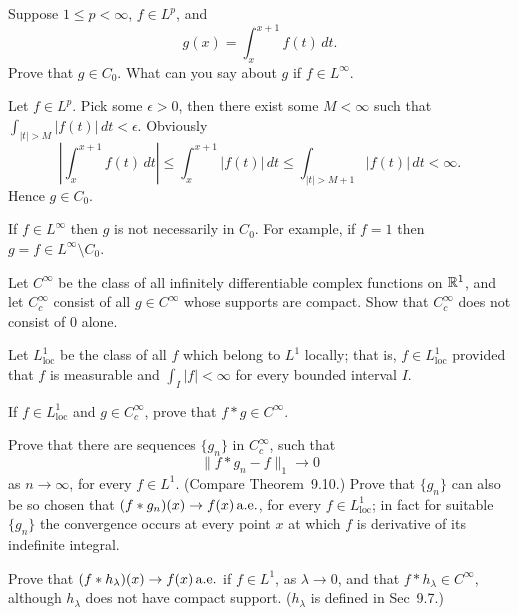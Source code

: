 \begin{enumerate}
\begin{excopy}
Suppose \(1\leq p < \infty\), \(f\in L^p\), and
\begin{equation*}
g(x) = \int_x^{x+1} f(t)\,dt.
\end{equation*}
Prove that \(g\in C_0\). What can you say about $g$ if \(f\in L^\infty\).
\end{excopy}

Let \(f\in L^p\). Pick some \(\epsilon>0\), then there exist some \(M<\infty\)
such that \(\int_{|t|>M} |f(t)|\,dt < \epsilon\).
Obviously 
\begin{equation*}
\left|\int_x^{x+1}f(t)\,dt\right|
\leq \int_x^{x+1}|f(t)|\,dt
\leq \int_{|t|>M+1}|f(t)|\,dt < \infty.
\end{equation*}
Hence \(g\in C_0\).

If \(f\in L^\infty\) then $g$ is not necessarily in \(C_0\).
For example, if \(f=1\) then \(g=f\in L^\infty \setminus C_0\).


\begin{excopy}
Let \(C^\infty\) be the class of all infinitely differentiable complex functions
on \(\mathbb{R}^1\), and let \(C_c^\infty\) consist of all \(g\in C^\infty\) 
whose supports are compact.
Show that  \(C_c^\infty\) does not consist of $0$ alone.

Let \(L_{\textrm{loc}}^1\) be the class 
of all $f$ which belong to \(L^1\) locally;
that is, \(f\in L_{\textrm{loc}}^1\) provided that $f$ is measurable
and \(\int_I |f|<\infty\) for every bounded interval $I$.

If \(f\in L_{\textrm{loc}}^1\) and \(g\in C_c^\infty\), prove that 
\(f\ast g \in C^\infty\).

Prove that there are sequences \(\{g_n\}\) in \(C_c^\infty\), such that
\begin{equation*}
\|f\ast g_n - f\|_1 \to 0
\end{equation*}
as \(n\to \infty\), for every \(f\in L^1\).
(Compare Theorem~9.10.)
Prove that  \(\{g_n\}\) can also be so chosen that 
\((f\ast g_n)(x) \to f(x)\,\textrm{a.e.}\), for every \(f\in L_{\textrm{loc}}^1\);
in fact for suitable \(\{g_n\}\) the convergence occurs at every point
$x$ at which $f$ is derivative of its indefinite integral.

Prove that \((f \ast h_\lambda)(x) \to f(x) \,\textrm{a.e.}\) if \(f\in L^1\), 
as \(\lambda\to 0\), and that \(f\ast h_\lambda \in C^\infty\),
although \(h_\lambda\) does not have compact support.
(\(h_\lambda\) is defined in Sec~9.7.)
\end{excopy} 


\end{enumerate}
